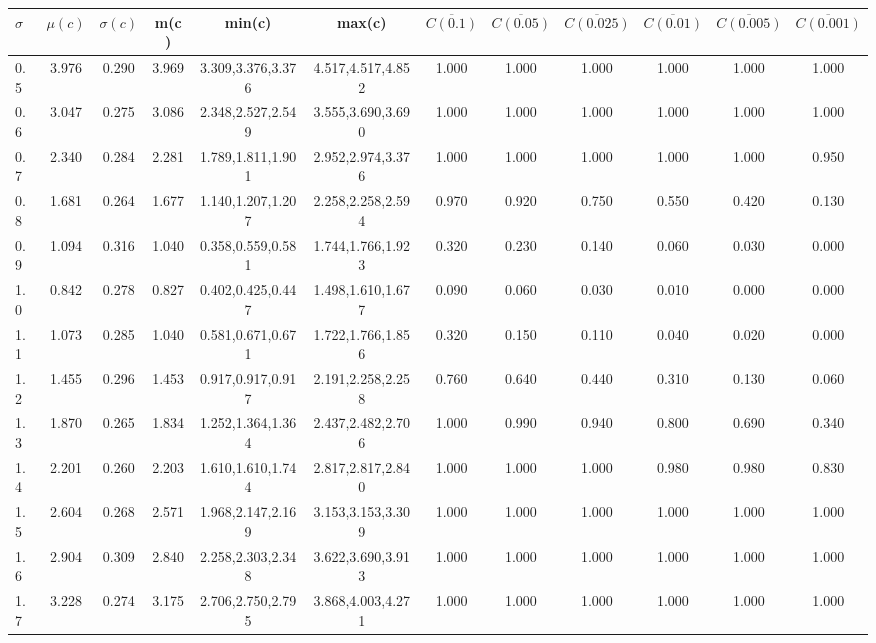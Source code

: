 \begin{table*}[h!]
\begin{center}
\begin{tabular}{| l | c | c | c | c | c | c | c | c | c | c | c |}\hline
$\sigma$ & $\mu(c)$ & $\sigma(c)$ & m(c) & min(c) & max(c) & $\overline{C(0.1)}$ & $\overline{C(0.05)}$ & $\overline{C(0.025)}$ & $\overline{C(0.01)}$ & $\overline{C(0.005)}$ & $\overline{C(0.001)}$ \\\hline
0.5 & 3.976 & 0.290 & 3.969 & 3.309,3.376,3.376 & 4.517,4.517,4.852  & 1.000  & 1.000  & 1.000  & 1.000  & 1.000  & 1.000 \\\hline
0.6 & 3.047 & 0.275 & 3.086 & 2.348,2.527,2.549 & 3.555,3.690,3.690  & 1.000  & 1.000  & 1.000  & 1.000  & 1.000  & 1.000 \\\hline
0.7 & 2.340 & 0.284 & 2.281 & 1.789,1.811,1.901 & 2.952,2.974,3.376  & 1.000  & 1.000  & 1.000  & 1.000  & 1.000  & 0.950 \\\hline
0.8 & 1.681 & 0.264 & 1.677 & 1.140,1.207,1.207 & 2.258,2.258,2.594  & 0.970  & 0.920  & 0.750  & 0.550  & 0.420  & 0.130 \\\hline
0.9 & 1.094 & 0.316 & 1.040 & 0.358,0.559,0.581 & 1.744,1.766,1.923  & 0.320  & 0.230  & 0.140  & 0.060  & 0.030  & 0.000 \\\hline
1.0 & 0.842 & 0.278 & 0.827 & 0.402,0.425,0.447 & 1.498,1.610,1.677  & 0.090  & 0.060  & 0.030  & 0.010  & 0.000  & 0.000 \\\hline
1.1 & 1.073 & 0.285 & 1.040 & 0.581,0.671,0.671 & 1.722,1.766,1.856  & 0.320  & 0.150  & 0.110  & 0.040  & 0.020  & 0.000 \\\hline
1.2 & 1.455 & 0.296 & 1.453 & 0.917,0.917,0.917 & 2.191,2.258,2.258  & 0.760  & 0.640  & 0.440  & 0.310  & 0.130  & 0.060 \\\hline
1.3 & 1.870 & 0.265 & 1.834 & 1.252,1.364,1.364 & 2.437,2.482,2.706  & 1.000  & 0.990  & 0.940  & 0.800  & 0.690  & 0.340 \\\hline
1.4 & 2.201 & 0.260 & 2.203 & 1.610,1.610,1.744 & 2.817,2.817,2.840  & 1.000  & 1.000  & 1.000  & 0.980  & 0.980  & 0.830 \\\hline
1.5 & 2.604 & 0.268 & 2.571 & 1.968,2.147,2.169 & 3.153,3.153,3.309  & 1.000  & 1.000  & 1.000  & 1.000  & 1.000  & 1.000 \\\hline
1.6 & 2.904 & 0.309 & 2.840 & 2.258,2.303,2.348 & 3.622,3.690,3.913  & 1.000  & 1.000  & 1.000  & 1.000  & 1.000  & 1.000 \\\hline
1.7 & 3.228 & 0.274 & 3.175 & 2.706,2.750,2.795 & 3.868,4.003,4.271  & 1.000  & 1.000  & 1.000  & 1.000  & 1.000  & 1.000 \\\hline

\end{tabular}
\end{center}
\end{table*}
